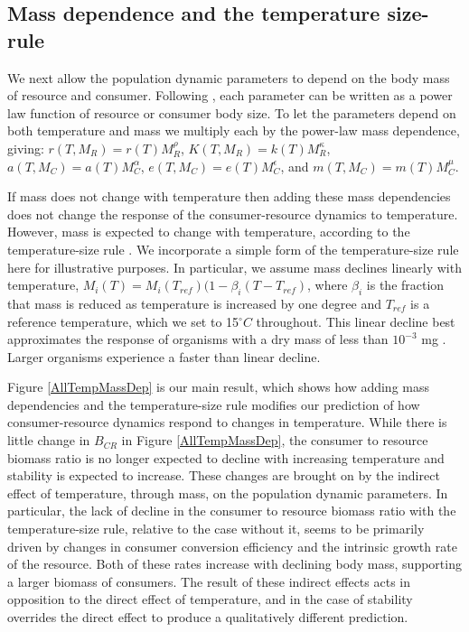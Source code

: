\documentclass[letter,12pt]{article}
\begin{document}
\subsection{Mass dependence and the temperature size-rule}

We next allow the population dynamic parameters to depend on the body mass of resource and consumer.
Following \cite{DeLong2015}, each parameter can be written as a power law function of resource or consumer body size.
To let the parameters depend on both temperature and mass we multiply each by the power-law mass dependence, giving: $r(T, M_R) = r(T) M_R^\rho$, $K(T, M_R) = k(T) M_R^\kappa$, $a(T, M_C) = a(T) M_C^\alpha$, $e(T, M_C) = e(T) M_C^\epsilon$, and $m(T, M_C) = m(T) M_C^\mu$.

If mass does not change with temperature then adding these mass dependencies does not change the response of the consumer-resource dynamics to temperature.
However, mass is expected to change with temperature, according to the temperature-size rule \cite{Atkinson1994}.
We incorporate a simple form of the temperature-size rule here for illustrative purposes.
In particular, we assume mass declines linearly with temperature, $M_i(T) = M_i(T_{ref}) (1 - \beta_i (T - T_{ref})$, where $\beta_i$ is the fraction that mass is reduced as temperature is increased by one degree and $T_{ref}$ is a reference temperature, which we set to 15$^\circ C$ throughout.
This linear decline best approximates the response of organisms with a dry mass of less than $10^{-3}$ mg \cite{Forster2012}.
Larger organisms experience a faster than linear decline.

Figure \ref{AllTempMassDep} is our main result, which shows how adding mass dependencies and the temperature-size rule modifies our prediction of how consumer-resource dynamics respond to changes in temperature.
While there is little change in $B_{CR}$ in Figure \ref{AllTempMassDep}, the consumer to resource biomass ratio is no longer expected to decline with increasing temperature and stability is expected to increase.
These changes are brought on by the indirect effect of temperature, through mass, on the population dynamic parameters.
In particular, the lack of decline in the consumer to resource biomass ratio with the temperature-size rule, relative to the case without it, seems to be primarily driven by changes in consumer conversion efficiency and the intrinsic growth rate of the resource.
Both of these rates increase with declining body mass, supporting a larger biomass of consumers. 
The result of these indirect effects acts in opposition to the direct effect of temperature, and in the case of stability overrides the direct effect to produce a qualitatively different prediction.
\end{document}
